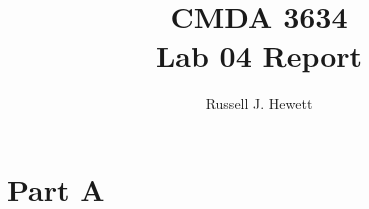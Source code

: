 \documentclass[letter]{article}
\title{CMDA 3634 \\ Lab 04 Report}
\author{Russell J. Hewett}
\begin{document}
\maketitle

\section*{Part A}




% 
\end{document}
